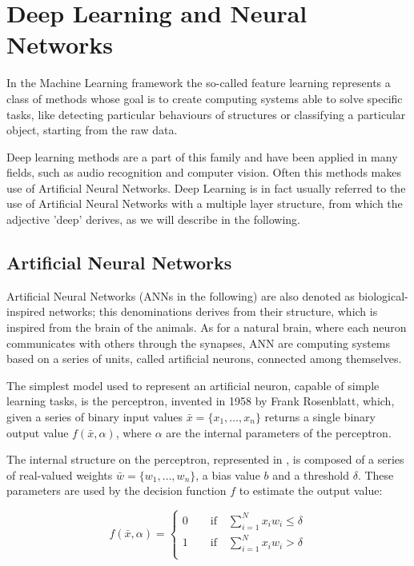 \chapter{Deep Learning and Neural Networks}

In the Machine Learning framework the so-called feature learning represents a class of methods whose goal is to create computing systems able to solve specific tasks, like detecting particular behaviours of structures or classifying a particular object, starting from the raw data.

Deep learning methods are a part of this family and have been applied in many fields, such as audio recognition and computer vision. Often this methods makes use of Artificial Neural Networks. Deep Learning is in fact usually referred to the use of Artificial Neural Networks with a multiple layer structure, from which the adjective 'deep' derives, as we will describe in the following.

\section{Artificial Neural Networks}

Artificial Neural Networks (ANNs in the following) are also denoted as biological-inspired networks; this denominations derives from their structure, which is inspired from  the brain of the animals. As for a natural brain, where each neuron communicates with others through the synapses, ANN are computing systems based on a series of units, called artificial neurons, connected among themselves. 

The simplest model used to represent an artificial neuron, capable of simple learning tasks, is the perceptron, invented in 1958 by Frank Rosenblatt, which, given a series of binary input values $\bar{x}=\{x_1,\dots, x_n\}$ returns a single binary output value $f(\bar{x}, \alpha)$, where $\alpha$ are the internal parameters of the perceptron. 

The internal structure on the perceptron, represented in , is composed of a series of real-valued weights $\bar{w}=\{w_1,\dots,w_n\}$, a bias value $b$ and a threshold $\delta$. These parameters are used by the decision function $f$ to estimate the output value:

\begin{equation}
f(\bar{x},\alpha) = 
\begin{cases}
0\qquad\text{if}\quad\sum_{i=1}^N x_iw_i \leq \delta \\
1\qquad\text{if}\quad\sum_{i=1}^N x_iw_i > \delta \\
\end{cases}
\end{equation}

